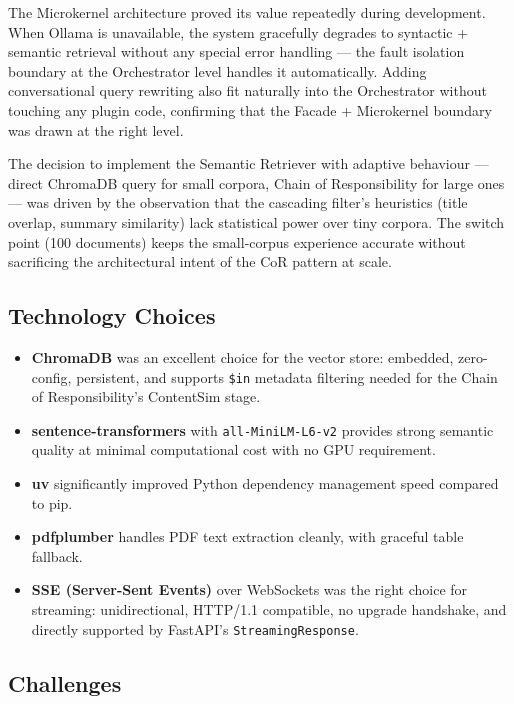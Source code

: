\documentclass[11pt,a4paper]{article}
\begin{document}
The Microkernel architecture proved its value repeatedly during development. When Ollama is unavailable, the system gracefully degrades to syntactic + semantic retrieval without any special error handling --- the fault isolation boundary at the Orchestrator level handles it automatically. Adding conversational query rewriting also fit naturally into the Orchestrator without touching any plugin code, confirming that the Facade + Microkernel boundary was drawn at the right level.

The decision to implement the Semantic Retriever with adaptive behaviour --- direct ChromaDB query for small corpora, Chain of Responsibility for large ones --- was driven by the observation that the cascading filter's heuristics (title overlap, summary similarity) lack statistical power over tiny corpora. The switch point (100 documents) keeps the small-corpus experience accurate without sacrificing the architectural intent of the CoR pattern at scale.

\subsection{Technology Choices}

\begin{itemize}
    \item \textbf{ChromaDB} was an excellent choice for the vector store: embedded, zero-config, persistent, and supports \texttt{\$in} metadata filtering needed for the Chain of Responsibility's ContentSim stage.
    \item \textbf{sentence-transformers} with \texttt{all-MiniLM-L6-v2} provides strong semantic quality at minimal computational cost with no GPU requirement.
    \item \textbf{uv} significantly improved Python dependency management speed compared to pip.
    \item \textbf{pdfplumber} handles PDF text extraction cleanly, with graceful table fallback.
    \item \textbf{SSE (Server-Sent Events)} over WebSockets was the right choice for streaming: unidirectional, HTTP/1.1 compatible, no upgrade handshake, and directly supported by FastAPI's \texttt{StreamingResponse}.
\end{itemize}

\subsection{Challenges}
\end{document}
